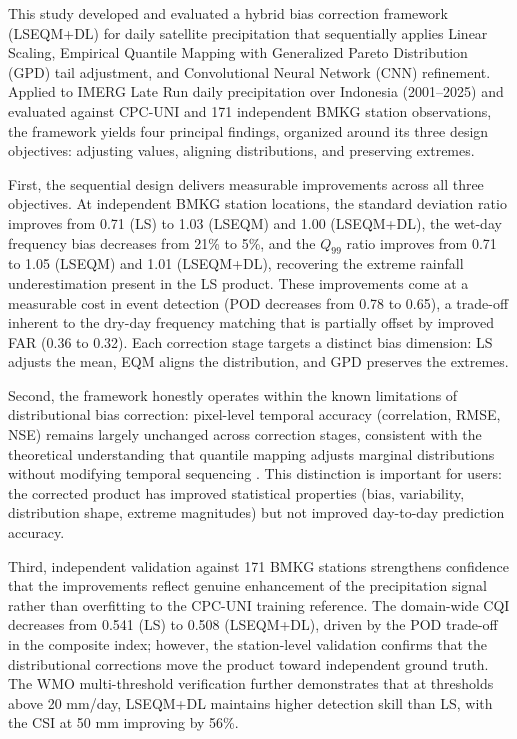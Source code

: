 \documentclass[
]{article}
\begin{document}
This study developed and evaluated a hybrid bias correction framework
(LSEQM+DL) for daily satellite precipitation that sequentially applies
Linear Scaling, Empirical Quantile Mapping with Generalized Pareto
Distribution (GPD) tail adjustment, and Convolutional Neural Network
(CNN) refinement. Applied to IMERG Late Run daily precipitation over
Indonesia (2001--2025) and evaluated against CPC-UNI and 171 independent
BMKG station observations, the framework yields four principal findings,
organized around its three design objectives: adjusting values, aligning
distributions, and preserving extremes.

First, the sequential design delivers measurable improvements across all
three objectives. At independent BMKG station locations, the standard
deviation ratio improves from 0.71 (LS) to 1.03 (LSEQM) and 1.00
(LSEQM+DL), the wet-day frequency bias decreases from 21\% to 5\%, and
the \(Q_{99}\) ratio improves from 0.71 to 1.05 (LSEQM) and 1.01
(LSEQM+DL), recovering the extreme rainfall underestimation present in
the LS product. These improvements come at a measurable cost in event
detection (POD decreases from 0.78 to 0.65), a trade-off inherent to the
dry-day frequency matching \cite{ref11} that is partially offset by improved
FAR (0.36 to 0.32). Each correction stage targets a distinct bias
dimension: LS adjusts the mean, EQM aligns the distribution, and GPD
preserves the extremes.

Second, the framework honestly operates within the known limitations of
distributional bias correction: pixel-level temporal accuracy
(correlation, RMSE, NSE) remains largely unchanged across correction
stages, consistent with the theoretical understanding that quantile
mapping adjusts marginal distributions without modifying temporal
sequencing \cite{ref34}. This distinction is important for users: the
corrected product has improved statistical properties (bias,
variability, distribution shape, extreme magnitudes) but not improved
day-to-day prediction accuracy.

Third, independent validation against 171 BMKG stations strengthens
confidence that the improvements reflect genuine enhancement of the
precipitation signal rather than overfitting to the CPC-UNI training
reference. The domain-wide CQI decreases from 0.541 (LS) to 0.508
(LSEQM+DL), driven by the POD trade-off in the composite index; however,
the station-level validation confirms that the distributional
corrections move the product toward independent ground truth. The WMO
multi-threshold verification further demonstrates that at thresholds
above 20 mm/day, LSEQM+DL maintains higher detection skill than LS, with
the CSI at 50 mm improving by 56\%.
\end{document}
